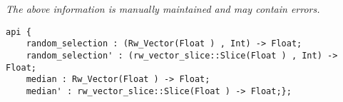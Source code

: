 \label{pkg:random\_sample}

{\tiny \it The above information is manually maintained and may contain errors.}
\begin{verbatim}
api {
    random_selection : (Rw_Vector(Float ) , Int) -> Float;
    random_selection' : (rw_vector_slice::Slice(Float ) , Int) -> Float;
    median : Rw_Vector(Float ) -> Float;
    median' : rw_vector_slice::Slice(Float ) -> Float;};
\end{verbatim}

